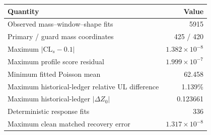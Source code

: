 \begin{tabular}{lr}
\toprule
Quantity & Value \\
\midrule
Observed mass--window--shape fits & 5915 \\
Primary / guard mass coordinates & 425 / 420 \\
Maximum $|\mathrm{CL}_s-0.1|$ & $1.382\times10^{-8}$ \\
Maximum profile score residual & $1.999\times10^{-7}$ \\
Minimum fitted Poisson mean & 62.458 \\
Maximum historical-ledger relative UL difference & 1.139\% \\
Maximum historical-ledger $|\Delta Z_0|$ & 0.123661 \\
Deterministic response fits & 336 \\
Maximum clean matched recovery error & $1.317\times10^{-8}$ \\
\bottomrule
\end{tabular}
